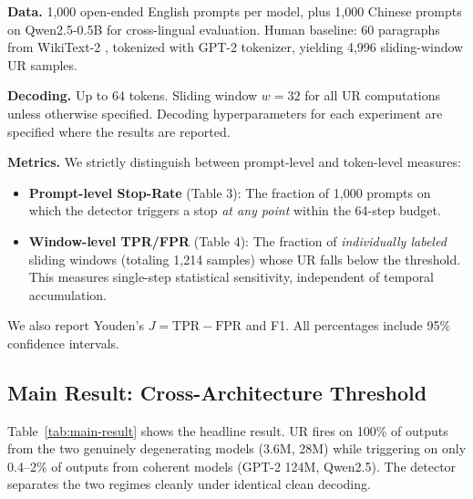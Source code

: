 \documentclass[11pt]{article}
\begin{document}
\textbf{Data.} 1,000 open-ended English prompts per model, plus 1,000 Chinese prompts on Qwen2.5-0.5B for cross-lingual evaluation. Human baseline: 60 paragraphs from WikiText-2 \citep{merity2016}, tokenized with GPT-2 tokenizer, yielding 4,996 sliding-window UR samples.

\textbf{Decoding.} Up to 64 tokens. Sliding window $w=32$ for all UR computations unless otherwise specified. Decoding hyperparameters for each experiment are specified where the results are reported.

\textbf{Metrics.} We strictly distinguish between prompt-level and token-level measures:
\begin{itemize}
    \item \textbf{Prompt-level Stop-Rate} (Table 3): The fraction of 1,000 prompts on which the detector triggers a stop \textit{at any point} within the 64-step budget.
    \item \textbf{Window-level TPR/FPR} (Table 4): The fraction of \textit{individually labeled} sliding windows (totaling 1,214 samples) whose UR falls below the threshold. This measures single-step statistical sensitivity, independent of temporal accumulation.
\end{itemize}
We also report Youden’s $J = \text{TPR} - \text{FPR}$ and F1. All percentages include 95\% confidence intervals.

\subsection{Main Result: Cross-Architecture Threshold}
\label{sec:main-result}

Table~\ref{tab:main-result} shows the headline result. UR fires on 100\% of outputs from the two genuinely degenerating models (3.6M, 28M) while triggering on only 0.4--2\% of outputs from coherent models (GPT-2 124M, Qwen2.5). The detector separates the two regimes cleanly under identical clean decoding.
\end{document}
